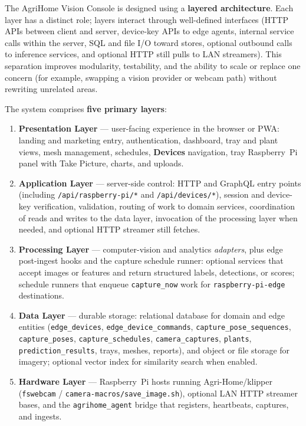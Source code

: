\label{sec:overview}

The AgriHome Vision Console is designed using a \textbf{layered architecture}. Each layer has a distinct role; layers interact through well-defined interfaces (HTTP APIs between client and server, device-key APIs to edge agents, internal service calls within the server, SQL and file I/O toward stores, optional outbound calls to inference services, and optional HTTP still pulls to LAN streamers). This separation improves modularity, testability, and the ability to scale or replace one concern (for example, swapping a vision provider or webcam path) without rewriting unrelated areas.

The system comprises \textbf{five primary layers}:

\begin{enumerate}
  \item \textbf{Presentation Layer} — user-facing experience in the browser or PWA: landing and marketing entry, authentication, dashboard, tray and plant views, mesh management, schedules, \textbf{Devices} navigation, tray Raspberry~Pi panel with Take Picture, charts, and uploads.
  \item \textbf{Application Layer} — server-side control: HTTP and GraphQL entry points (including \texttt{/api/raspberry-pi/*} and \texttt{/api/devices/*}), session and device-key verification, validation, routing of work to domain services, coordination of reads and writes to the data layer, invocation of the processing layer when needed, and optional HTTP streamer still fetches.
  \item \textbf{Processing Layer} — computer-vision and analytics \emph{adapters}, plus edge post-ingest hooks and the capture schedule runner: optional services that accept images or features and return structured labels, detections, or scores; schedule runners that enqueue \texttt{capture\_now} work for \texttt{raspberry-pi-edge} destinations.
  \item \textbf{Data Layer} — durable storage: relational database for domain and edge entities (\texttt{edge\_devices}, \texttt{edge\_device\_commands}, \texttt{capture\_pose\_sequences}, \texttt{capture\_poses}, \texttt{capture\_schedules}, \texttt{camera\_captures}, \texttt{plants}, \texttt{prediction\_results}, trays, meshes, reports), and object or file storage for imagery; optional vector index for similarity search when enabled.
  \item \textbf{Hardware Layer} — Raspberry~Pi hosts running Agri-Home/klipper (\texttt{fswebcam} / \texttt{camera-macros/save\_image.sh}), optional LAN HTTP streamer bases, and the \texttt{agrihome\_agent} bridge that registers, heartbeats, captures, and ingests.
\end{enumerate}


